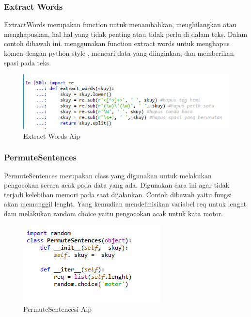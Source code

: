 \subsubsection{Extract Words}
ExtractWords merupakan function untuk menambahkan, menghilangkan atau menghapuskan, hal hal yang tidak penting atau tidak perlu di dalam teks. Dalam contoh dibawah ini. menggunakan function extract words untuk menghapus komen dengan python style , mencari data yang diinginkan, dan memberikan spasi pada teks.
\begin{figure}[!hbtp]
\centering
\includegraphics[scale=0.3]{figures/AIP/e15.PNG}
\caption{Extract Words Aip}
\label{Praktek}
\end{figure}

\subsubsection{PermuteSentences}
PermuteSentences merupakan class yang digunakan untuk melakukan pengocokan secara acak pada data yang ada. Digunakan cara ini agar tidak terjadi kelebihan memori pada saat dijalankan. Contoh dibawah yaitu fungsi akan memanggil lenght. Yang kemudian mendefinisikan variabel req untuk lenght dam melakukan random choice yaitu pengocokan acak untuk kata motor.
\begin{figure}[!hbtp]
\centering
\includegraphics[scale=0.3]{figures/AIP/e16.PNG}
\caption{PermuteSentencesi Aip}
\label{Praktek}
\end{figure}


